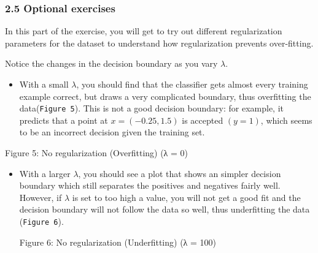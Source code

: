 \documentclass[11pt]{article}
\providecommand{\tightlist}{%
      \setlength{\itemsep}{0pt}\setlength{\parskip}{0pt}}
\begin{document}
    \subsubsection{2.5 Optional exercises}\label{optional-exercises}

In this part of the exercise, you will get to try out different
regularization parameters for the dataset to understand how
regularization prevents over-fitting.

Notice the changes in the decision boundary as you vary \(\lambda\).

\begin{itemize}
\tightlist
\item
  With a small \(\lambda\), you should find that the classifier gets
  almost every training example correct, but draws a very complicated
  boundary, thus overfitting the data(\texttt{Figure\ 5}). This is not a
  good decision boundary: for example, it predicts that a point at
  \(x = (−0.25, 1.5)\) is accepted \((y = 1)\), which seems to be an
  incorrect decision given the training set.
\end{itemize}

Figure 5: No regularization (Overfitting) (λ = 0)

\begin{itemize}
\tightlist
\item
  With a larger \(\lambda\), you should see a plot that shows an simpler
  decision boundary which still separates the positives and negatives
  fairly well. However, if \(\lambda\) is set to too high a value, you
  will not get a good fit and the decision boundary will not follow the
  data so well, thus underfitting the data (\texttt{Figure\ 6}).

  Figure 6: No regularization (Underfitting) (λ = 100)
\end{itemize}


    
    
    
    
\end{document}
